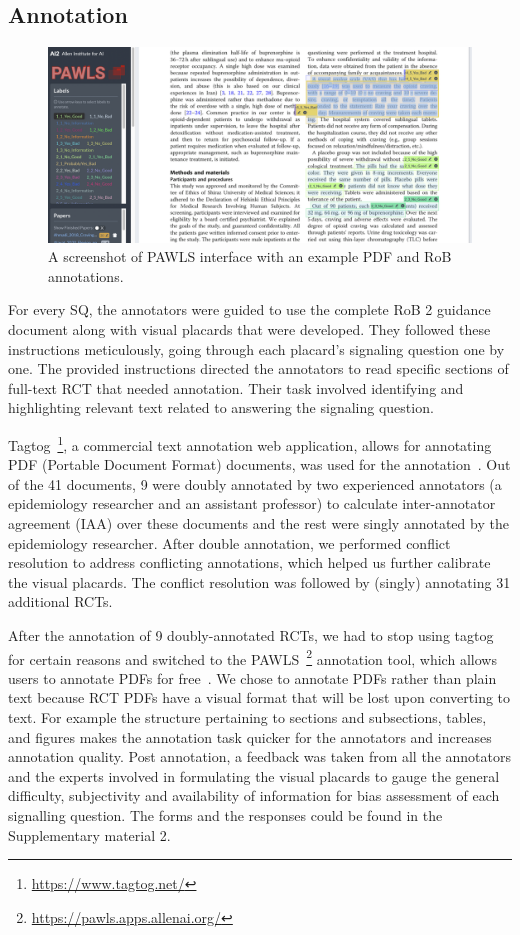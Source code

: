 \documentclass[sn-mathphys,Numbered]{sn-jnl}%
\theoremstyle{thmstyleone}%
\theoremstyle{thmstyletwo}%
\theoremstyle{thmstylethree}%
\begin{document}
\subsection{Annotation}
\label{annotation}
%
%
%
%
\begin{figure}[htb]
    \centering
    \includegraphics[width=0.80\columnwidth]{figures/pawls_layout.png}
    \caption{A screenshot of PAWLS interface with an example PDF and RoB annotations.}
    \label{fig:pawls}
\end{figure}
%
%
%
For every SQ, the annotators were guided to use the complete RoB 2 guidance document along with visual placards that were developed.
They followed these instructions meticulously, going through each placard's signaling question one by one.
The provided instructions directed the annotators to read specific sections of full-text RCT that needed annotation.
Their task involved identifying and highlighting relevant text related to answering the signaling question.



Tagtog~\footnote{\url{https://www.tagtog.net/}}, a commercial text annotation web application, allows for annotating PDF (Portable Document Format) documents, was used for the annotation~\cite{cejuela2014tagtog}.
Out of the 41 documents, 9 were doubly annotated by two experienced annotators (a epidemiology researcher and an assistant professor) to calculate inter-annotator agreement (IAA) over these documents and the rest were singly annotated by the epidemiology researcher.
After double annotation, we performed conflict resolution to address conflicting annotations, which helped us further calibrate the visual placards.
The conflict resolution was followed by (singly) annotating 31 additional RCTs.


After the annotation of 9 doubly-annotated RCTs, we had to stop using tagtog for certain reasons and switched to the PAWLS~\footnote{\url{https://pawls.apps.allenai.org/}} annotation tool, which allows users to annotate PDFs for free~\cite{neumann2021pawls}.
We chose to annotate PDFs rather than plain text because RCT PDFs have a visual format that will be lost upon converting to text. 
For example the structure pertaining to sections and subsections, tables, and figures makes the annotation task quicker for the annotators and increases annotation quality.
Post annotation, a feedback was taken from all the annotators and the experts involved in formulating the visual placards to gauge the general difficulty, subjectivity and availability of information for bias assessment of each signalling question.
The forms and the responses could be found in the Supplementary material 2. %
%
%
%
\end{document}
